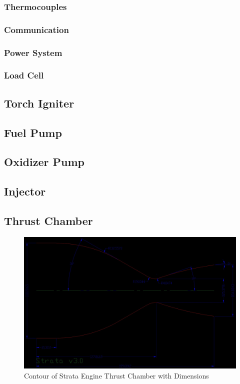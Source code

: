 \documentclass[12pt, letterpaper]{article}
\begin{document}
\subsubsection{Thermocouples}
\subsubsection{Communication}
\subsubsection{Power System}
\subsubsection{Load Cell}
\subsection{Torch Igniter}
\subsection{Fuel Pump}
\subsection{Oxidizer Pump}
\subsection{Injector}
\subsection{Thrust Chamber}

\begin{figure}[H]
    \centering
    \includegraphics[width=16cm]{Images/Thrust_Chamber_Contour_v3.0_2kN.jpg}
    \caption{Contour of Strata Engine Thrust Chamber with Dimensions}
\end{figure}
\end{document}
